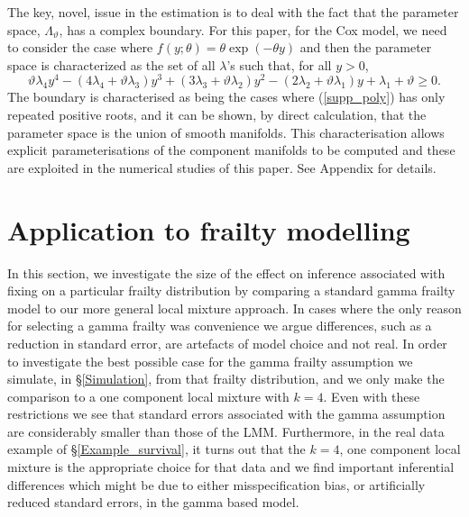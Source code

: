 \documentclass[graybox]{svmult}
\begin{document}
The key, novel, issue in the estimation is to deal with the fact that the parameter space, $\Lambda_{\vartheta}$, has a complex boundary. For this paper, for the Cox model,  we need to  consider the case where $f(y;\theta) =\theta\exp(-\theta y)$ and then the  parameter space is characterized as the set of all 
$\lambda$'s such that, for all $y>0$,
\begin{equation}\label{supp_poly}
\vartheta \lambda_4 y^4-(4 \lambda_4+\vartheta \lambda_3) y^3+(3\lambda_3 + \vartheta \lambda_2)y^2-(2 \lambda_2+\vartheta \lambda_1) y+ \lambda_1+\vartheta \ge 0.
\end{equation}
The boundary is characterised as being the cases where  (\ref{supp_poly}) has  only repeated positive roots, and it can be shown, by direct calculation, that the parameter space is the union of smooth manifolds.   This characterisation allows explicit parameterisations of the component manifolds to be computed and these are exploited in the numerical studies of this paper. See Appendix for details. 

\section{Application to frailty modelling}\label{Application to frailty modelling}

In this section, we investigate the size of the effect on inference associated with fixing on a particular frailty
distribution by comparing a standard gamma frailty model to our more general local mixture approach.  In cases where
the only reason for selecting a gamma frailty was convenience  we argue differences, such as a reduction in standard
error, are artefacts of  model choice and not real.  In order to investigate the best possible case for the gamma
frailty assumption we simulate, in \S \ref{Simulation}, from that frailty distribution, and we only make the comparison
to  a one component  local mixture with $k=4$. Even with these restrictions we see that standard errors associated with
the gamma assumption are considerably smaller than those of the LMM.   Furthermore, in  the real data example of \S \ref{Example_survival},
it turns out that the $k=4$, one component  local mixture is the appropriate choice for that data and   we find important
inferential differences which might be due to either  misspecification   bias,  or artificially reduced standard errors,
in the gamma based model. 
\end{document}
